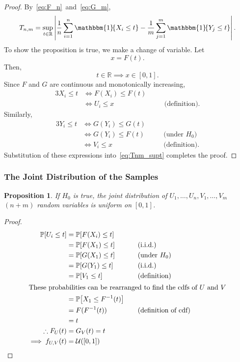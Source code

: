 \documentclass[letterpaper, oneside, reqno]{amsart}
\newtheorem{prop}{Proposition}[section]
\numberwithin{equation}{section}
\newcommand{\Prob}[1]{\mathbb{P}\mleft[#1\mright]}
\newcommand{\R}{\mathbb{R}}  %
\newcommand{\U}[2]{\mathcal{U}\mleft(\mleft[ #1, #2 \mright]\mright)}
\newcommand{\indic}[1]{\mathbbm{1}\!\mleft\{#1\mright\}} %
\newcommand{\iid}{i.i.d.}
\newcommand{\sumi}[2]{\sum_{#1=1}^{#2}}
\newcommand{\avg}[2]{\frac{1}{#2}\sumi{#1}{#2}}
\newcommand{\by}[1]{&\quad&\text{(#1)}}
\begin{document}
\begin{proof}
  By~\eqref{eq:F_n}~and~\eqref{eq:G_m},
  \begin{equation} \label{eq:Tnm_supt}
    T_{n,m} = \sup_{t \in \R} \left| \avg{i}{n} \indic{X_i \le t} - \avg{j}{m} \indic{Y_j \le t} \right|.
  \end{equation}
  To show the proposition is true, we make a change of variable. Let
    \[ x = F(t). \]
  Then,
    \[ t \in \R \implies x \in [0, 1]. \]
    Since $F$ and $G$ are continuous and monotonically increasing,
  \begin{alignat*}{3}
    X_i \le t &\iff F(X_i) \le F(t) \\
              &\iff U_i \le x \by{definition}.
  \end{alignat*}
  Similarly,
  \begin{alignat*}{3}
    Y_i \le t &\iff G(Y_i) \le G(t) \\
              &\iff G(Y_i) \le F(t) \by{under $H_0$} \\
              &\iff V_i \le x \by{definition}.
  \end{alignat*}
  Substitution of these expressions into~\eqref{eq:Tnm_supt} completes the
  proof. 
\end{proof}

\subsubsection{The Joint Distribution of the Samples}
\begin{prop} \label{prop:Tnm}
  If $H_0$ is true, the joint distribution of $U_1, \dots, U_n, V_1, \dots, V_m$
  $(n+m)$ random variables is uniform on $[0, 1]$.
\end{prop}

\begin{proof}
  \begin{alignat*}{3}
    \Prob{U_i \le t} &= \Prob{F(X_i) \le t} \\
                     &= \Prob{F(X_1) \le t} \by{\iid} \\
                     &= \Prob{G(X_1) \le t} \by{under $H_0$} \\
                     &= \Prob{G(Y_1) \le t} \by{\iid} \\
                     &= \Prob{V_1 \le t} \by{definition} \\
    \intertext{These probabilities can be rearranged to find the cdfs of $U$ and $V$}
                     &= \Prob{X_1 \le F^{-1}(t)} \\
                     &= F(F^{-1}(t)) \by{definition of cdf} \\
                     &= t \\
    \therefore F_U(t) &= G_V(t) = t \\
    \implies f_{U,V}(t) &= \U{0}{1} \qedhere
  \end{alignat*}
\end{proof}
\end{document}
